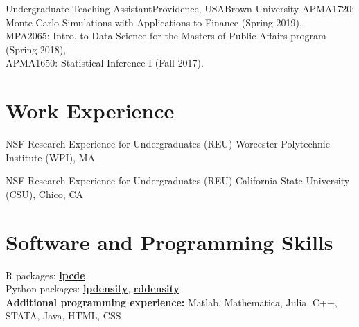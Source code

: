 \documentclass[10pt,a4paper,roman]{moderncv}        %
\begin{document}
{Undergraduate Teaching Assistant}{Providence, USA}{Brown University}
{APMA1720: Monte Carlo Simulations with Applications to Finance (Spring 2019), \\
  MPA2065: Intro. to Data Science for the Masters of Public Affairs program (Spring 2018),
  \\
  APMA1650: Statistical Inference I (Fall 2017).
}

\vspace{-0.3cm}
\section{Work Experience}
{NSF Research Experience for Undergraduates (REU) }
{Worcester Polytechnic Institute (WPI), MA}
{} {
}

{NSF Research Experience for Undergraduates (REU)}
{California State University (CSU), Chico, CA}
{}
{}

\vspace{-0.3cm}
\section{Software and Programming Skills}
R packages:
\color{blue}\href{https://nppackages.github.io/lpcde/}{\textbf{lpcde}}\color{black}
\\
Python packages: \color{blue}\href{https://nppackages.github.io/lpdensity_doc/}
{\textbf{lpdensity}}\color{black},
\color{blue}\href{https://rdpackages.github.io/rddensity_doc/}
{\textbf{rddensity}}\color{black}
\\
\textbf{Additional programming experience:}
Matlab, Mathematica, Julia, C++, STATA, Java, HTML, CSS
\end{document}
